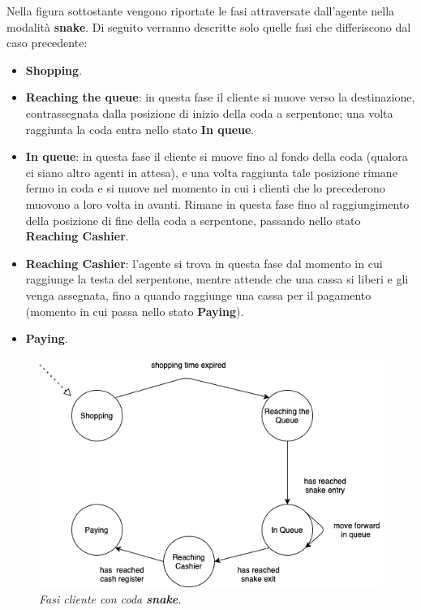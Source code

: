 Nella figura sottostante vengono riportate le fasi attraversate dall'agente nella modalità \textbf{snake}. Di seguito verranno descritte solo quelle fasi che differiscono dal caso precedente:

\begin{itemize}
    \item \textbf{Shopping}.
    \item \textbf{Reaching the queue}: in questa fase il cliente si muove verso la destinazione, contrassegnata dalla posizione di inizio della coda a serpentone; una volta raggiunta la coda entra nello stato \textbf{In queue}.
    \item \textbf{In queue}: in questa fase il cliente si muove fino al fondo della coda (qualora ci siano altro agenti in attesa), e una volta raggiunta tale posizione rimane fermo in coda e si muove nel momento in cui i clienti che lo precederono muovono a loro volta in avanti. Rimane in questa fase fino al raggiungimento della posizione di fine della coda a serpentone, passando nello stato \textbf{Reaching Cashier}.
    \item \textbf{Reaching Cashier}: l'agente si trova in questa fase dal momento in cui raggiunge la testa del serpentone, mentre attende che una cassa si liberi e gli venga assegnata, fino a quando raggiunge una cassa per il pagamento (momento in cui passa nello stato \textbf{Paying}).
    \item \textbf{Paying}.
\end{itemize}

\begin{figure}[h!]
    \includegraphics[width=\linewidth]{img/FSM-phases-snake.png}
    \centering
    \caption{\textit{Fasi cliente con coda \textbf{snake}.}}
\end{figure}

